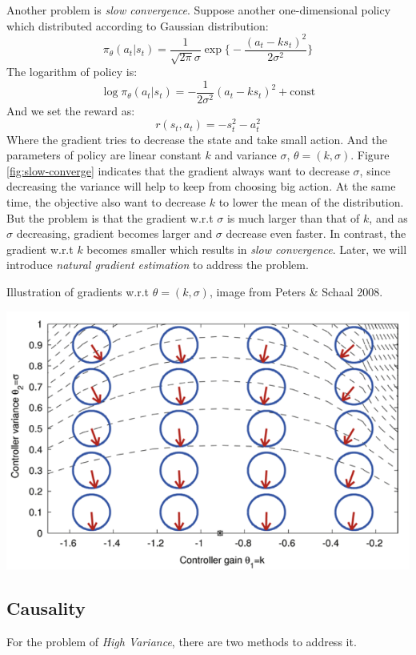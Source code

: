 \documentclass{tufte-handout}
\begin{document}
Another problem is \emph{slow convergence}. Suppose another one-dimensional policy which distributed according to Gaussian distribution:
\[
\pi_\theta (a_t | s_t) = \frac{1}{\sqrt{2\pi} \sigma} \exp \bigg\{ - \frac{(a_t - ks_t) ^ 2}{2 \sigma^2} \bigg\}
\]
The logarithm of policy is:
\[\log  \pi_\theta (a_t | s_t) =- \frac{1}{2 \sigma^2}(a_t - ks_t) ^ 2  + \text{const} \]
And we set the reward as:
\[
r(s_t, a_t) = -s_t^2 - a_t ^2
\]
\indent Where the gradient tries to decrease the state and take small action. And the parameters of policy are linear constant $k$ and variance $\sigma$,
$\theta = (k, \sigma)$. Figure \ref{fig:slow-converge} indicates that the gradient always want to decrease $\sigma$, since decreasing the variance will
help to keep from choosing big action. At the same time, the objective also want to decrease $k$ to lower the mean of the distribution. But the problem is that the gradient w.r.t $\sigma$ is much larger than that of $k$, and as $\sigma$ decreasing, gradient becomes larger and $\sigma$ decrease even faster. In contrast, the gradient w.r.t $k$ becomes smaller which results in \emph{slow convergence}. Later, we will introduce \emph{natural gradient estimation} to address the problem.
\begin{marginfigure}
  \centering
  \caption{Illustration of gradients w.r.t $\theta =(k, \sigma)$, image from Peters \& Schaal 2008.}
  \includegraphics[width=\linewidth]{slow}
  \label{fig:slow-converge}
\end{marginfigure}

\subsection{Causality}
For the problem of \emph{High Variance}, there are two methods to address it.
\end{document}
